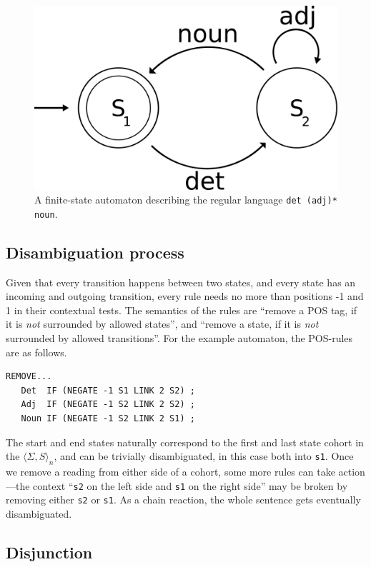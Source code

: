 \documentclass[11pt]{article}
\def\t#1{\texttt{#1}}
\def\maxAmbFSA#1{$\langle \Sigma,S \rangle_#1$}
\begin{document}
\begin{figure}[t]
  \centering
    \includegraphics[width=0.7\linewidth]{fsa.png}
  \caption{A finite-state automaton describing the regular language \t{det (adj)* noun}.}
 \label{fig:fsa}
\end{figure}


\subsection{Disambiguation process}


Given that every transition happens between two states, and every state 
has an incoming and outgoing transition, every rule needs no more than
positions -1 and 1 in their contextual tests. 
The semantics of the rules are ``remove a POS tag, if it is \emph{not} surrounded by allowed states'',
and ``remove a state, if it is \emph{not} surrounded by allowed transitions''.
For the example automaton, the POS-rules are as follows.

\begin{verbatim}
REMOVE...
   Det  IF (NEGATE -1 S1 LINK 2 S2) ;
   Adj  IF (NEGATE -1 S2 LINK 2 S2) ;
   Noun IF (NEGATE -1 S2 LINK 2 S1) ;
\end{verbatim}

The start and end states naturally correspond to the first and last state cohort 
in the \maxAmbFSA{n}, and can be trivially disambiguated, in this case both into \t{s1}.
Once we remove a reading from either side of a cohort, some more rules 
can take action---the context ``\t{s2} on the left side and \t{s1} on the right side''
may be broken by removing either \t{s2} or \t{s1}.
As a chain reaction, the whole sentence gets eventually disambiguated.

\subsection{Disjunction}
\end{document}

